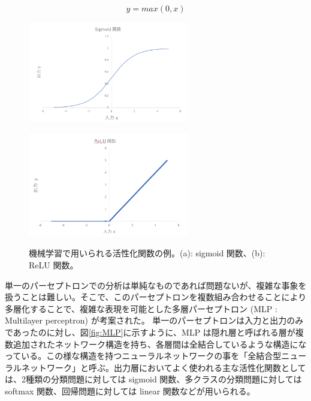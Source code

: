 \begin{equation}
    y = max(0,x)
    \label{equ:ReLU}
\end{equation}
\begin{figure}
    \centering
    \begin{minipage}[b]{0.4\linewidth}
        \centering
        \includegraphics[clip, width=7cm]{fig/4/sigmoid.png}
        \vspace{10pt}
        \subcaption{}
        \label{fig:sigmoid}
    \end{minipage}
    \hfill
    \begin{minipage}[b]{0.4\linewidth}
        \centering
        \includegraphics[clip, width=7cm]{fig/4/ReLU.png}
        \vspace{10pt}
        \subcaption{}
        \label{fig:ReLU}
    \end{minipage}
    \caption{機械学習で用いられる活性化関数の例。(a): sigmoid 関数、(b): ReLU 関数。}
    \label{fig:acctivation}
\end{figure}
単一のパーセプトロンでの分析は単純なものであれば問題ないが、複雑な事象を扱うことは難しい。そこで、このパーセプトロンを複数組み合わせることにより多層化することで、複雑な表現を可能とした多層パーセプトロン (MLP : Multilayer perceptron) が考案された。
単一のパーセプトロンは入力と出力のみであったのに対し、図\ref{fig:MLP}に示すように、MLP は隠れ層と呼ばれる層が複数追加されたネットワーク構造を持ち、各層間は全結合しているような構造になっている。この様な構造を持つニューラルネットワークの事を「全結合型ニューラルネットワーク」と呼ぶ。出力層においてよく使われる主な活性化関数としては、2種類の分類問題に対しては sigmoid 関数、多クラスの分類問題に対しては softmax 関数、回帰問題に対しては linear 関数などが用いられる。

